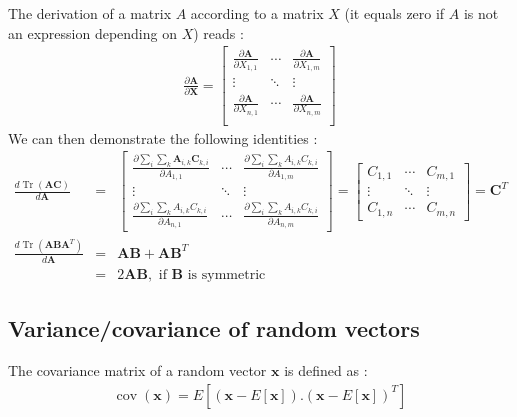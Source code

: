 \documentclass[10pt,oneside]{scrartcl}
\newcommand\vecteur[1]{\boldsymbol#1}
\newcommand\matrice[1]{\mathbf#1}
\newcommand\trace{\operatorname*{Tr}}
\newcommand\cov{\operatorname*{cov}}
\begin{document}
The derivation of a matrix $A$ according to a matrix $X$ (it equals zero if $A$ is not an expression depending on $X$) reads :
\begin{eqnarray}
\frac{\partial \matrice{A}}{\partial \matrice{X}} =\begin{bmatrix}
\frac{\partial\mathbf{A}}{\partial X_{1,1}} & \cdots & \frac{\partial \mathbf{A}}{\partial X_{1,m}}\\
\vdots & \ddots & \vdots\\
\frac{\partial\mathbf{A}}{\partial X_{n,1}} & \cdots & \frac{\partial \mathbf{A}}{\partial X_{n,m}}\\
\end{bmatrix}
\end{eqnarray}
We can then demonstrate the following identities :
\begin{eqnarray}
\frac{d \trace(\matrice{A} \matrice{C})}{d \matrice{A}} &=& \begin{bmatrix}
\frac{\partial \sum_i \sum_k \matrice{A}_{i,k}\matrice{C}_{k,i}}{\partial A_{1,1}} & \cdots & \frac{\partial \sum_i \sum_k A_{i,k}C_{k,i}}{\partial A_{1,m}}\\
\vdots & \ddots & \vdots\\
\frac{\partial\sum_i \sum_k A_{i,k}C_{k,i}}{\partial A_{n,1}} & \cdots & \frac{\partial \sum_i \sum_k A_{i,k}C_{k,i}}{\partial A_{n,m}}
\end{bmatrix}
= \begin{bmatrix}
C_{1,1} & \cdots & C_{m,1}\\
\vdots & \ddots & \vdots\\
C_{1,n} & \cdots & C_{m,n}
\end{bmatrix}
= \matrice{C}^T\\
\frac{d \trace(\matrice{A} \matrice{B} \matrice{A}^T)}{d\matrice A} &=& \matrice{A}\matrice{B} + \matrice{A}\matrice{B}^T \\ 
                                                                    &=& 2 \matrice{A} \matrice{B},\mbox{ if } \matrice{B} \mbox{ is symmetric}
\end{eqnarray} 

\subsection{Variance/covariance of random vectors}

The covariance matrix of a random vector $\vecteur{x}$ is defined as :
\begin{eqnarray}
\nonumber \cov(\vecteur{x}) = E[(\vecteur{x} - E[\vecteur{x}]).(\vecteur{x} - E[\vecteur{x}])^T]
\end{eqnarray}
\end{document}
